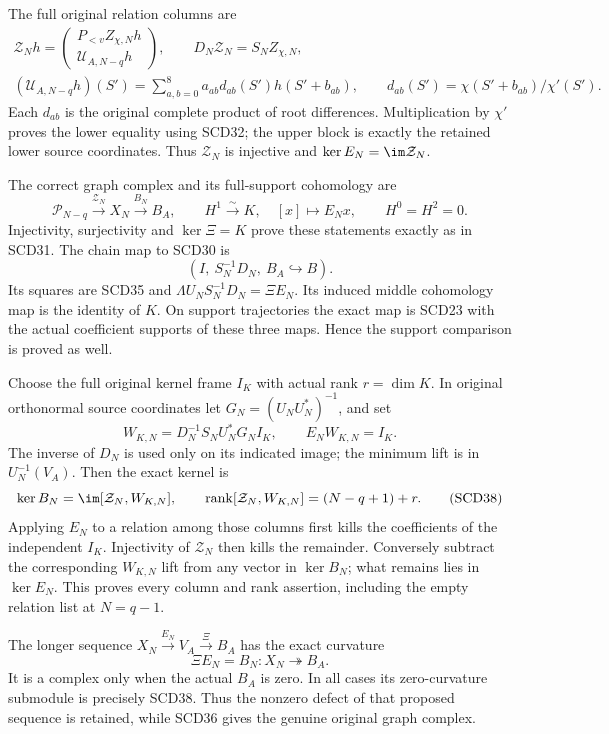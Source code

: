 \documentclass[11pt,a4paper]{article}
\theoremstyle{definition}\newtheorem{definition}[theorem]{Definition}
\newcommand{\rk}{\operatorname{rank}}\newcommand{\cl}{\operatorname{cl}}
\newcommand{\Pp}{\mathcal P}\newcommand{\LL}{\mathcal L}
\begin{document}
The full original relation columns are
\[
 \begin{gathered}
 \mathcal Z_Nh=
 \begin{pmatrix}P_{<v}Z_{\chi,N}h\\\mathcal U_{A,N-q}h\end{pmatrix},
 \qquad D_N\mathcal Z_N=S_NZ_{\chi,N},\\
 (\mathcal U_{A,N-q}h)(S')
 =\sum_{a,b=0}^8a_{ab}d_{ab}(S')h(S'+b_{ab}),\qquad
 d_{ab}(S')=\chi(S'+b_{ab})/\chi'(S').
 \end{gathered}
 \tag{SCD35}
\]
Each \(d_{ab}\) is the original complete product of root differences.
Multiplication by \(\chi'\) proves the lower equality using SCD32;
the upper block is exactly the retained lower source coordinates.
Thus \(\mathcal Z_N\) is injective and
\(\ker E_N=\im\mathcal Z_N\).

The correct graph complex and its full-support cohomology are
\[
 \Pp_{N-q}\xrightarrow{\mathcal Z_N}X_N\xrightarrow{B_N}B_A,
 \qquad H^1\xrightarrow{\sim}K,\quad[x]\mapsto E_Nx,
 \qquad H^0=H^2=0 .
 \tag{SCD36}
\]
Injectivity, surjectivity and \(\ker\Xi=K\) prove these statements
exactly as in SCD31. The chain map to SCD30 is
\[
 (I,\ S_N^{-1}D_N,\ B_A\hookrightarrow B).
 \tag{SCD37}
\]
Its squares are SCD35 and
\(\Lambda U_NS_N^{-1}D_N=\Xi E_N\). Its induced middle
cohomology map is the identity of \(K\). On support trajectories
the exact map is SCD23 with the actual coefficient supports of
these three maps. Hence the support comparison is proved as well.

Choose the full original kernel frame \(I_K\) with actual rank
\(r=\dim K\). In original orthonormal source coordinates let
\(G_N=(U_NU_N^*)^{-1}\), and set
\[
 W_{K,N}=D_N^{-1}S_NU_N^*G_NI_K,\qquad
 E_NW_{K,N}=I_K .
\]
The inverse of \(D_N\) is used only on its indicated image;
the minimum lift is in \(U_N^{-1}(V_A)\). Then the exact kernel is
\[
 \ker B_N=\im[\mathcal Z_N,W_{K,N}],\qquad
 \rk[\mathcal Z_N,W_{K,N}]=(N-q+1)+r .
 \tag{SCD38}
\]
Applying \(E_N\) to a relation among those columns first kills
the coefficients of the independent \(I_K\). Injectivity of
\(\mathcal Z_N\) then kills the remainder. Conversely subtract
the corresponding \(W_{K,N}\) lift from any vector in \(\ker B_N\);
what remains lies in \(\ker E_N\). This proves every column and
rank assertion, including the empty relation list at \(N=q-1\).

The longer sequence \(X_N\xrightarrow{E_N}V_A\xrightarrow{\Xi}B_A\)
has the exact curvature
\[
 \Xi E_N=B_N:X_N\twoheadrightarrow B_A .
 \tag{SCD39}
\]
It is a complex only when the actual \(B_A\) is zero. In all cases
its zero-curvature submodule is precisely SCD38. Thus the nonzero
defect of that proposed sequence is retained, while SCD36 gives
the genuine original graph complex.
\end{document}

